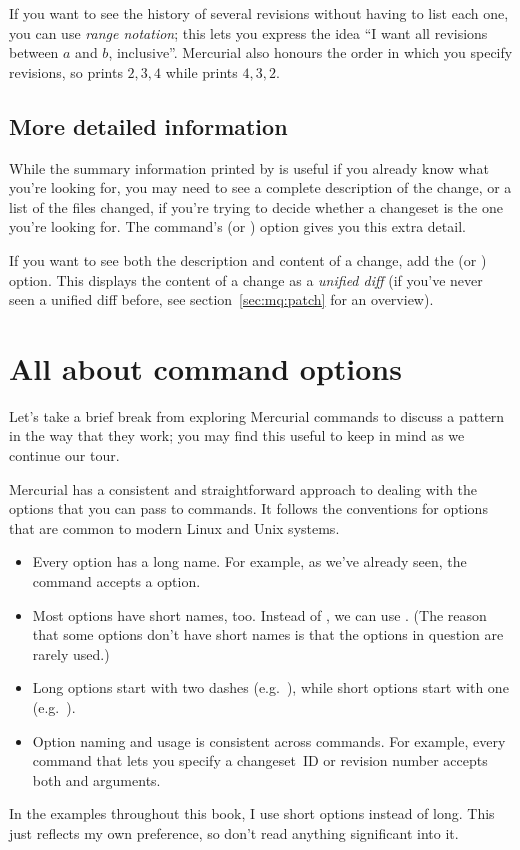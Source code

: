 If you want to see the history of several revisions without having to
list each one, you can use \emph{range notation}; this lets you
express the idea ``I want all revisions between $a$ and $b$,
inclusive''.
Mercurial also honours the order in which you specify revisions, so
 prints $2,3,4$ while 
prints $4,3,2$.

\subsection{More detailed information}

While the summary information printed by  is useful if you
already know what you're looking for, you may need to see a complete
description of the change, or a list of the files changed, if you're
trying to decide whether a changeset is the one you're looking for.
The  command's  (or )
option gives you this extra detail.

If you want to see both the description and content of a change, add
the  (or ) option.  This displays
the content of a change as a \emph{unified diff} (if you've never seen
a unified diff before, see section~\ref{sec:mq:patch} for an overview).

\section{All about command options}

Let's take a brief break from exploring Mercurial commands to discuss
a pattern in the way that they work; you may find this useful to keep
in mind as we continue our tour.

Mercurial has a consistent and straightforward approach to dealing
with the options that you can pass to commands.  It follows the
conventions for options that are common to modern Linux and Unix
systems.
\begin{itemize}
\item Every option has a long name.  For example, as we've already
  seen, the  command accepts a  option.
\item Most options have short names, too.  Instead of
  , we can use .  (The reason that
  some options don't have short names is that the options in question
  are rarely used.)
\item Long options start with two dashes (e.g.~),
  while short options start with one (e.g.~).
\item Option naming and usage is consistent across commands.  For
  example, every command that lets you specify a changeset~ID or
  revision number accepts both  and 
  arguments.
\end{itemize}
In the examples throughout this book, I use short options instead of
long.  This just reflects my own preference, so don't read anything
significant into it.

